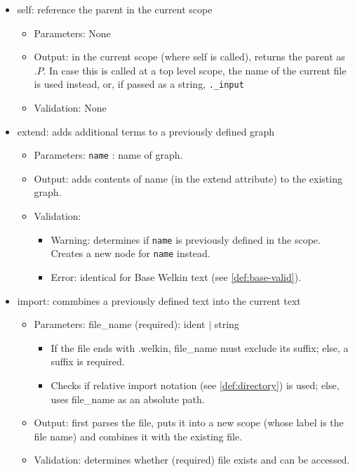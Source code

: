 \begin{itemize}
  \item self: reference the parent in the current scope
  \begin{itemize}
    \item Parameters: None
    \item Output: in the current scope (where self is called), returns the parent as $.P$. In case this is called at a top level scope, the name of the current file is used instead, or, if passed as a string, \texttt{.\_input}
    \item Validation: None
  \end{itemize}
  \item extend: adds additional terms to a previously defined graph
  \begin{itemize}
    \item Parameters: \texttt{name} : name of graph.
    \item Output: adds contents of name (in the extend attribute) to the existing graph.
    \item Validation:
      \begin{itemize}
        \item Warning: determines if \texttt{name} is previously defined in the scope. Creates a new node for \texttt{name} instead.
      \item Error: identical for Base Welkin text (see \ref{def:base-valid}).
      \end{itemize}
  \end{itemize}
  \item import: commbines a previously defined text into the current text
  \begin{itemize}
    \item Parameters: file\_name (required): ident $|$ string
    \begin{itemize}
      \item If the file ends with .welkin, file\_name must exclude its suffix; else, a suffix is required.
      \item Checks if relative import notation (see \ref{def:directory}) is used; else, uses file\_name as an absolute path.
    \end{itemize}
    \item Output: first parses the file, puts it into a new scope (whose label is the file name) and combines it with the existing file.
    \item Validation: determines whether (required) file exists and can be accessed.
  \end{itemize}

\end{itemize}

